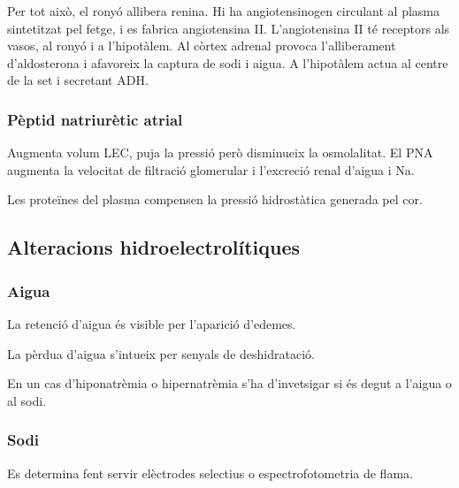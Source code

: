 Per tot això, el ronyó allibera renina. Hi ha angiotensinogen
circulant al plasma sintetitzat pel fetge, i es fabrica angiotensina
II. L'angiotensina II té receptors als vasos, al ronyó i a
l'hipotàlem. Al còrtex adrenal provoca l'alliberament d'aldosterona i
afavoreix la captura de sodi i aigua. A l'hipotàlem actua al centre de
la set i secretant ADH.

\subsubsection{Pèptid natriurètic atrial}
\label{sec:pept-natr-atri}

Augmenta volum LEC, puja la pressió però disminueix la osmolalitat. El
PNA augmenta la velocitat de filtració glomerular i l'excreció renal
d'aigua i Na.

Les proteïnes del plasma compensen la pressió hidrostàtica generada
pel cor.

\subsection{Alteracions hidroelectrolítiques}
\label{sec:alter-hidr}

\subsubsection{Aigua}
\label{sec:aigua}

La retenció d'aigua és visible per l'aparició d'edemes.

La pèrdua d'aigua s'intueix per senyals de deshidratació.

En un cas d'hiponatrèmia o hipernatrèmia s'ha d'invetsigar si és degut
a l'aigua o al sodi.

\subsubsection{Sodi}
\label{sec:sodi}
Es determina fent servir elèctrodes selectius o espectrofotometria de
flama.

